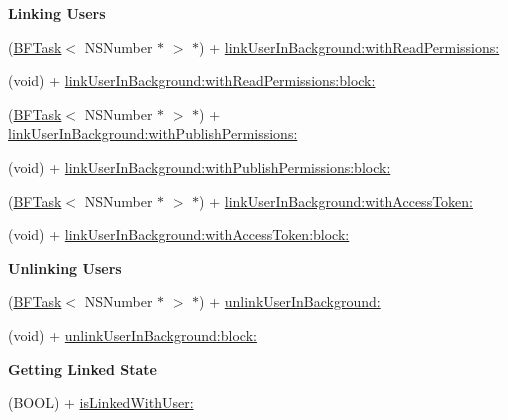 \begin{Indent}{\bf Linking Users}\par
{\em 

 

 }\begin{DoxyCompactItemize}
\item 
(\hyperlink{class_b_f_task}{B\+F\+Task}$<$ N\+S\+Number $\ast$ $>$ $\ast$) + \hyperlink{interface_p_f_facebook_utils_a725414c0b2755aef8d778b21534d3f7f}{link\+User\+In\+Background\+:with\+Read\+Permissions\+:}
\item 
(void) + \hyperlink{interface_p_f_facebook_utils_a00bede6f1afef3981c7db3c0f0918c25}{link\+User\+In\+Background\+:with\+Read\+Permissions\+:block\+:}
\item 
(\hyperlink{class_b_f_task}{B\+F\+Task}$<$ N\+S\+Number $\ast$ $>$ $\ast$) + \hyperlink{interface_p_f_facebook_utils_af249072fc52d429f8e6b65748ff6f0f1}{link\+User\+In\+Background\+:with\+Publish\+Permissions\+:}
\item 
(void) + \hyperlink{interface_p_f_facebook_utils_a4c6ae47ee9eb0a22311accae612c4155}{link\+User\+In\+Background\+:with\+Publish\+Permissions\+:block\+:}
\item 
(\hyperlink{class_b_f_task}{B\+F\+Task}$<$ N\+S\+Number $\ast$ $>$ $\ast$) + \hyperlink{interface_p_f_facebook_utils_a1921535bda6ace5c9a8a3924e5a09d94}{link\+User\+In\+Background\+:with\+Access\+Token\+:}
\item 
(void) + \hyperlink{interface_p_f_facebook_utils_a57b7a2f326ff38b537d494c42a250add}{link\+User\+In\+Background\+:with\+Access\+Token\+:block\+:}
\end{DoxyCompactItemize}
\end{Indent}
\begin{Indent}{\bf Unlinking Users}\par
{\em 

 

 }\begin{DoxyCompactItemize}
\item 
(\hyperlink{class_b_f_task}{B\+F\+Task}$<$ N\+S\+Number $\ast$ $>$ $\ast$) + \hyperlink{interface_p_f_facebook_utils_a6a751768bb36597bcc9b7dc8b046154f}{unlink\+User\+In\+Background\+:}
\item 
(void) + \hyperlink{interface_p_f_facebook_utils_a4a4ae2a01790c4acdc005834ad1f6d07}{unlink\+User\+In\+Background\+:block\+:}
\end{DoxyCompactItemize}
\end{Indent}
\begin{Indent}{\bf Getting Linked State}\par
{\em 

 

 }\begin{DoxyCompactItemize}
\item 
(B\+O\+O\+L) + \hyperlink{interface_p_f_facebook_utils_ac97fda6c82c6682d992e21baf6f710ac}{is\+Linked\+With\+User\+:}
\end{DoxyCompactItemize}
\end{Indent}


